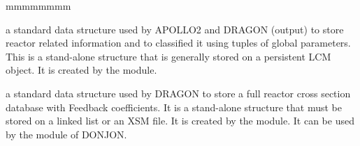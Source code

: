 \begin{ListeDeDescription}{mmmmmmmm}
\item[\dds{saphyb}] a standard data structure used by APOLLO2 and DRAGON (output) to store
reactor related information and to classified it using tuples of global
parameters. This is a stand-alone structure that is generally
stored on a persistent LCM object. It is created by the  module.

\item[\dds{fbmxsdb}] a standard data structure used by DRAGON to store
a full reactor cross section database with Feedback coefficients. 
It is a stand-alone structure that must be stored on a linked list or an XSM file. It is created by the  module. It can be used by the  module of DONJON.\cite{sissaoui}

\end{ListeDeDescription}

